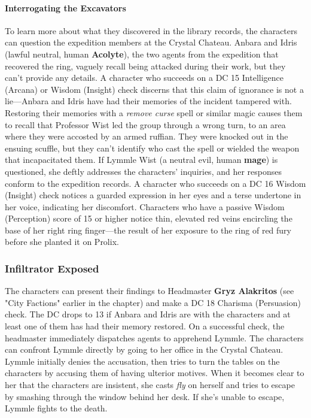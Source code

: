 \documentclass[10pt,a4,twoside,twocolumn,openany,nodeprecatedcode]{dndbook}
\begin{document}
\paragraph{Interrogating the Excavators}
To learn more about what they discovered in the library records, the characters can question the expedition members at the Crystal Chateau.
Anbara and Idris (lawful neutral, human \textbf{Acolyte}), the two agents from the expedition that recovered the ring, vaguely recall being attacked during their work, but they can't provide any details. A character who succeeds on a DC 15 Intelligence (Arcana) or Wisdom (Insight) check discerns that this claim of ignorance is not a lie—Anbara and Idris have had their memories of the incident tampered with. Restoring their memories with a \textit{remove curse} spell or similar magic causes them to recall that Professor Wist led the group through a wrong turn, to an area where they were accosted by an armed ruffian. They were knocked out in the ensuing scuffle, but they can't identify who cast the spell or wielded the weapon that incapacitated them.
If Lymmle Wist (a neutral evil, human \textbf{mage}) is questioned, she deftly addresses the characters' inquiries, and her responses conform to the expedition records. A character who succeeds on a DC 16 Wisdom (Insight) check notices a guarded expression in her eyes and a terse undertone in her voice, indicating her discomfort. Characters who have a passive Wisdom (Perception) score of 15 or higher notice thin, elevated red veins encircling the base of her right ring finger—the result of her exposure to the ring of red fury before she planted it on Prolix.
\subsubsection{Infiltrator Exposed}
The characters can present their findings to Headmaster \textbf{Gryz Alakritos} (see "City Factions" earlier in the chapter) and make a DC 18 Charisma (Persuasion) check. The DC drops to 13 if Anbara and Idris are with the characters and at least one of them has had their memory restored. On a successful check, the headmaster immediately dispatches agents to apprehend Lymmle.
The characters can confront Lymmle directly by going to her office in the Crystal Chateau. Lymmle initially denies the accusation, then tries to turn the tables on the characters by accusing them of having ulterior motives. When it becomes clear to her that the characters are insistent, she casts \textit{fly} on herself and tries to escape by smashing through the window behind her desk. If she's unable to escape, Lymmle fights to the death.
\end{document}
